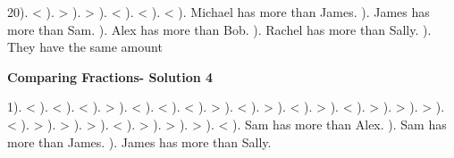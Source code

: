 \documentclass{article}%
\begin{document}
20). <%
). >%
). >%
). <%
). <%
). <%
). Michael has more than James.%
). James has more than Sam.%
). Alex has more than Bob.%
). Rachel has more than Sally.%
). They have the same amount%
\newline%
\newpage%
\large%
\begin{center}%
\textbf{Comparing Fractions- Solution 4}%
\newline%
\end{center} \normalsize%
1). <%
). <%
). <%
). >%
). <%
). <%
). <%
). >%
). <%
). >%
). <%
). >%
). <%
). >%
). >%
). >%
). <%
). >%
). >%
). >%
). <%
). >%
). >%
). >%
). <%
). Sam has more than Alex.%
). Sam has more than James.%
). James has more than Sally.%
\end{document}
